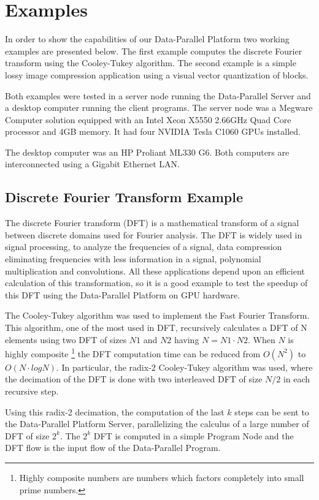 \documentclass[conference]{IEEEtran}
\begin{document}
\section{Examples}

In order to show the capabilities of our Data-Parallel Platform two working
examples are presented below. The first example computes the discrete Fourier
transform using the Cooley-Tukey algorithm. The second example is a simple lossy
image compression application using a visual vector quantization of blocks.

Both examples were tested in a server node running the Data-Parallel Server and
a desktop computer running the client programs.  The server node was a Megware
Computer solution equipped with an Intel Xeon X5550 2.66GHz Quad Core processor
and 4GB memory. It had four NVIDIA Tesla C1060 GPUs installed.
 
The desktop computer was an HP Proliant ML330 G6. Both computers are
interconnected using a Gigabit Ethernet LAN.

\subsection{Discrete Fourier Transform Example}

The discrete Fourier transform (DFT) is a mathematical transform of a signal
between discrete domains used for Fourier analysis. The DFT is widely used in
signal processing, to analyze the frequencies of a signal, data compression
eliminating frequencies with less information in a signal, polynomial
multiplication and convolutions. All these applications depend upon an efficient
calculation of this transformation, so it is a good example to test the speedup
of this DFT using the Data-Parallel Platform on GPU hardware.

The Cooley-Tukey\cite{CooleyTukey} algorithm was used to implement the Fast
Fourier Transform.  This algorithm, one of the most used in DFT, recursively
calculates a DFT of N elements using two DFT of sizes $N1$ and $N2$ having
$N=N1\cdot N2$. When $N$ is highly composite \footnote{Highly composite numbers
  are numbers which factors completely into small prime numbers.} the DFT
computation time can be reduced from $O(N^2)$ to $O(N \cdot log N)$.  In
particular, the radix-2 Cooley-Tukey algorithm was used, where the decimation of
the DFT is done with two interleaved DFT of size $N/2$ in each recursive step.

Using this radix-2 decimation, the computation of the last $k$ steps can be sent
to the Data-Parallel Platform Server, parallelizing the calculus of a large
number of DFT of size $2^k$.  The $2^k$ DFT is computed in a simple Program Node
and the DFT flow is the input flow of the Data-Parallel Program.
\end{document}
